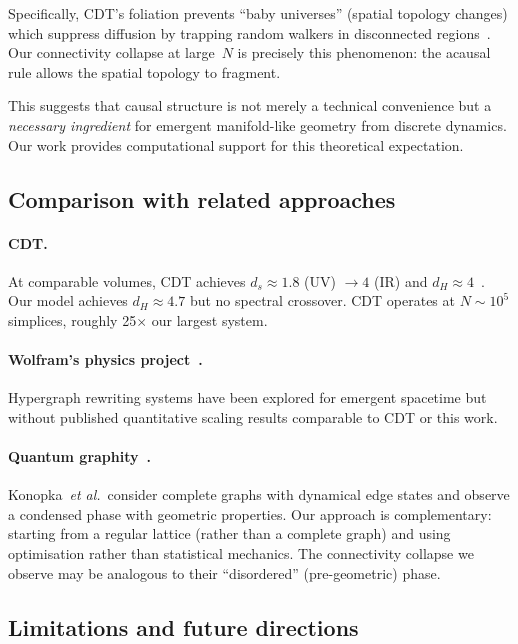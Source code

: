 \documentclass[aps,prd,twocolumn,superscriptaddress,floatfix]{revtex4-2}
\begin{document}
Specifically, CDT's foliation prevents ``baby universes''
(spatial topology changes) which suppress diffusion by
trapping random walkers in disconnected
regions~\cite{Ambjorn2004}.  Our connectivity collapse at
large~$N$ is precisely this phenomenon: the acausal rule
allows the spatial topology to fragment.

This suggests that causal structure is not merely a
technical convenience but a \emph{necessary ingredient} for
emergent manifold-like geometry from discrete dynamics.
Our work provides computational support for this theoretical
expectation.

\subsection{Comparison with related approaches}

\paragraph{CDT.}
At comparable volumes, CDT achieves $d_s \approx 1.8$ (UV)
$\to 4$ (IR) and $d_H \approx 4$~\cite{Ambjorn2005}.  Our
model achieves $d_H \approx 4.7$ but no spectral crossover.
CDT operates at $N \sim 10^5$ simplices, roughly 25$\times$
our largest system.

\paragraph{Wolfram's physics project~\cite{Wolfram2020}.}
Hypergraph rewriting systems have been explored for emergent
spacetime but without published quantitative scaling results
comparable to CDT or this work.

\paragraph{Quantum graphity~\cite{Konopka2008}.}
Konopka~\emph{et al.}\ consider complete graphs with
dynamical edge states and observe a condensed phase with
geometric properties.  Our approach is complementary:
starting from a regular lattice (rather than a complete graph)
and using optimisation rather than statistical mechanics.
The connectivity collapse we observe may be analogous to their
``disordered'' (pre-geometric) phase.

\subsection{Limitations and future directions}
\end{document}
